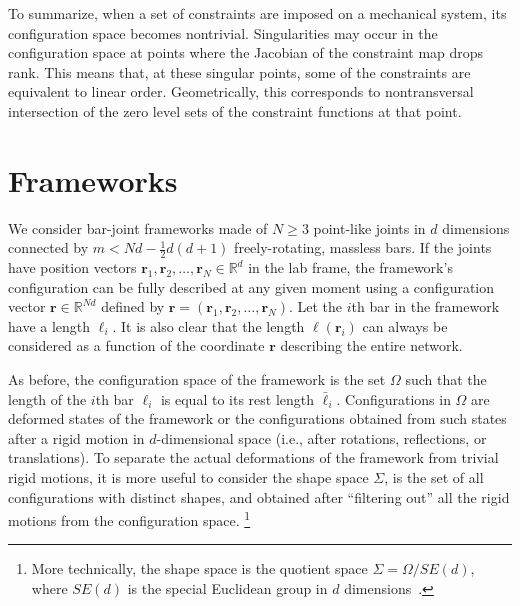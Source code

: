 

To summarize, when a set of constraints are imposed on a mechanical system, its configuration space becomes nontrivial.
Singularities may occur in the configuration space at points where the Jacobian of the constraint map drops rank.
This means that, at these singular points, some of the constraints are equivalent to linear order.
Geometrically, this corresponds to nontransversal intersection of the zero level sets of the constraint functions at that point.

\section{Frameworks}

We consider bar-joint frameworks made of $N \geq 3$ point-like joints in $d$ dimensions connected by $m < Nd - \frac{1}{2}d(d+1)$ freely-rotating, massless bars.
If the joints have position vectors $\bm{r}_1, \bm{r}_2, \ldots, \bm{r}_{N} \in \mathbb{R}^d$ in the lab frame, the framework's configuration can be fully described at any given moment using a configuration vector $\bm{r}\in\mathbb{R}^{N d}$ defined by $\bm{r} = (\bm{r}_1, \bm{r}_2, \ldots, \bm{r}_{N})$.
Let the $i$th bar in the framework have a length $\ell_{i}$.
It is also clear that the length $\ell(\bm{r}_{i})$ can always be considered as a function of the coordinate $\bm{r}$ describing the entire network.

As before, the configuration space of the framework is the set $\Omega$ such that the length of the $i$th bar $\ell_{i}$ is equal to its rest length $\bar{\ell}_{i}$.
Configurations in $\Omega$ are deformed states of the framework or the configurations obtained from such states after a rigid motion in $d$-dimensional space (i.e., after rotations, reflections, or translations).
To separate the actual deformations of the framework from trivial rigid motions, it is more useful to consider the shape space $\Sigma$, is the set of all configurations with distinct shapes, and
obtained after ``filtering out'' all the rigid motions from the configuration space.%
\footnote{More technically, the shape space is the quotient space $\Sigma = \Omega/SE(d)$, where $SE(d)$ is the special Euclidean group in $d$ dimensions~\cite{littlejohn1995}.}

